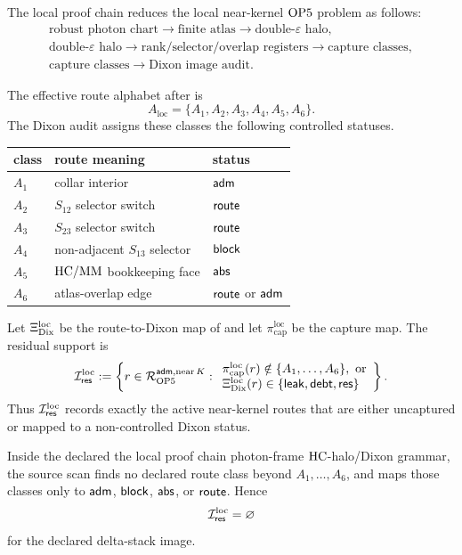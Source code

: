 The local proof chain reduces the local near-kernel \(\mathrm{OP5}\) problem as follows:
\[
\begin{gathered}
\text{robust photon chart}\to\text{finite atlas}\to\text{double-}\varepsilon\text{ halo},\\
\text{double-}\varepsilon\text{ halo}\to\text{rank/selector/overlap registers}\to\text{capture classes},\\
\text{capture classes}\to\text{Dixon image audit}.
\end{gathered}
\]

The effective route alphabet after is
\[
A_{\mathrm{loc}}=\{A_1,A_2,A_3,A_4,A_5,A_6\}.
\]
The Dixon audit assigns these classes the following controlled statuses.

\begin{center}
\begin{tabular}{lll}
\toprule
class & route meaning & status\\
\midrule
\(A_1\) & collar interior & \(\mathsf{adm}\)\\
\(A_2\) & \(S_{12}\) selector switch & \(\mathsf{route}\)\\
\(A_3\) & \(S_{23}\) selector switch & \(\mathsf{route}\)\\
\(A_4\) & non-adjacent \(S_{13}\) selector & \(\mathsf{block}\)\\
\(A_5\) & \(\mathrm{HC}/\mathrm{MM}\) bookkeeping face & \(\mathsf{abs}\)\\
\(A_6\) & atlas-overlap edge & \(\mathsf{route}\) or \(\mathsf{adm}\)\\
\bottomrule
\end{tabular}
\end{center}

\begin{definition}
Let \(\Xi_{\mathrm{Dix}}^{\mathrm{loc}}\) be the route-to-Dixon map of and let
\(\pi_{\mathrm{cap}}^{\mathrm{loc}}\) be the capture map. The residual support is
\[
\mathcal I_{\Res}^{\mathrm{loc}}
:=
\left\{
 r\in\mathcal R_{\OPfive}^{\Ad,\NearK}:
 \begin{array}{l}
 \pi_{\mathrm{cap}}^{\mathrm{loc}}(r)\notin \{A_1,\ldots,A_6\},\ \text{or}\\
 \Xi_{\Dix}^{\mathrm{loc}}(r)\in\{\Leak,\Debt,\Res\}
 \end{array}
\right\}.
\]
Thus \(\mathcal I_{\mathsf{res}}^{\mathrm{loc}}\) records exactly the active near-kernel routes
that are either uncaptured or mapped to a non-controlled Dixon status.
\end{definition}

\begin{proposition}
Inside the declared the local proof chain photon-frame \(\mathrm{HC}\)-halo/Dixon grammar, the source
scan finds no declared route class beyond \(A_1,\ldots,A_6\), and maps those
classes only to \(\mathsf{adm}\), \(\mathsf{block}\), \(\mathsf{abs}\), or \(\mathsf{route}\). Hence
\[
\mathcal I_{\mathsf{res}}^{\mathrm{loc}}=\varnothing
\]
for the declared delta-stack image.
\end{proposition}

